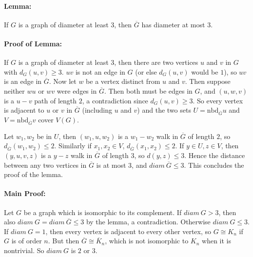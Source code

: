 \paragraph{Lemma:} 

If $G$ is a graph of diameter at least $3$, then $\overline{G}$ has diameter
at most $3$.

\paragraph{Proof of Lemma:} 

If $G$ is a graph of diameter at least $3$, then there are
two vertices $u$ and $v$ in $G$ with $d_G(u,v) \ge 3$. $uv$ is not an edge in $G$
(or else $d_G(u,v)$ would be $1$), so $uv$ is an edge in $\overline{G}$. Now
let $w$ be a vertex distinct from $u$ and $v$. Then suppose neither $wu$ or
$wv$ were edges in $\overline{G}$. Then both must be edges in $G$, and
$(u,w,v)$ is a $u-v$ path of length $2$, a contradiction since $d_G(u,v) \ge 3$.
So every vertex is adjacent to $u$ or $v$ in $\overline{G}$ (including $u$ and $v$) and 
the two sets $U=\text{nbd}_{\overline{G}} u$ and $V=\text{nbd}_{\overline{G}} v$ cover
$V(G)$.

Let $w_1, w_2$ be in  $U$, then $(w_1,u,w_2)$ is a $w_1-w_2$ walk in $\overline{G}$
of length $2$, so $d_{\overline{G}}(w_1,w_2)\le 2$. Similarly if $x_1,x_2 \in V$,
$d_{\overline{G}}(x_1,x_2)\le 2$. If $y \in U, z \in V$, then $(y,u,v,z)$ is a $y-z$
walk in $\overline{G}$ of length $3$, so $d(y,z) \le 3$. Hence the distance between
any two vertices in $\overline{G}$ is at most $3$, and $diam\ \overline{G} \le 3$. This
concludes the proof of the lemma.

\paragraph{Main Proof:}
Let $G$ be a graph which is isomorphic to its complement.
If $diam\ G >3$, then also 
$diam\ G = diam\ \overline{G} \le 3$
by the lemma, a contradiction. Otherwise $diam\ G \le 3$. If $diam\ G = 1$, then
every vertex is adjacent to every other vertex, so $G \cong K_n$ if $G$ is of order
$n$. But then $\overline{G} \cong \overline{K}_n$, which is not isomorphic to $K_n$
when it is nontrivial. So $diam\ G$ is $2$ or $3$.
